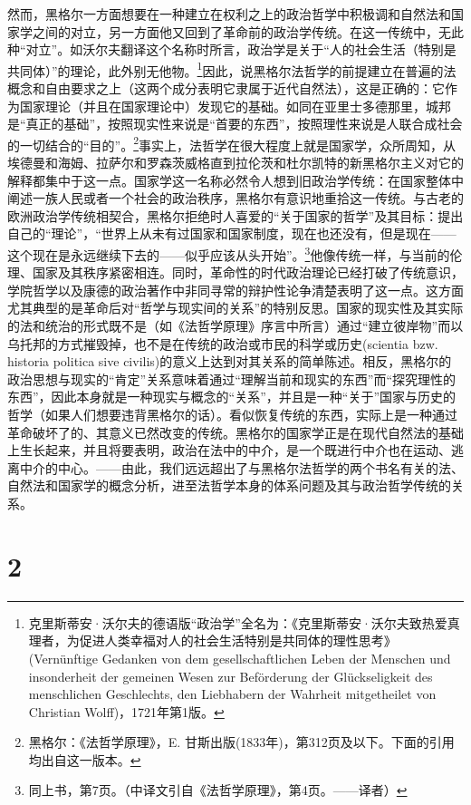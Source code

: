 然而，黑格尔一方面想要在一种建立在权利之上的政治哲学中积极调和自然法和国家学之间的对立，另一方面他又回到了革命前的政治学传统。在这一传统中，无此种“对立”。如沃尔夫翻译这个名称时所言，政治学是关于“人的社会生活（特别是共同体）”的理论，此外别无他物。\footnote{克里斯蒂安·沃尔夫的德语版“政治学”全名为：《克里斯蒂安·沃尔夫致热爱真理者，为促进人类幸福对人的社会生活特别是共同体的理性思考》(Vernünftige Gedanken von dem gesellschaftlichen Leben der Menschen und insonderheit der gemeinen Wesen zur Beförderung der Glückseligkeit des menschlichen Geschlechts, den Liebhabern der Wahrheit mitgetheilet von Christian Wolff)，1721年第1版。}因此，说黑格尔法哲学的前提建立在普遍的法概念和自由要求之上（这两个成分表明它隶属于近代自然法），这是正确的：它作为国家理论（并且在国家理论中）发现它的基础。如同在亚里士多德那里，城邦是“真正的基础”，按照现实性来说是“首要的东西”，按照理性来说是人联合成社会的一切结合的“目的”。\footnote{黑格尔：《法哲学原理》，E. 甘斯出版(1833年)，第312页及以下。下面的引用均出自这一版本。}事实上，法哲学在很大程度上就是国家学，众所周知，从埃德曼和海姆、拉萨尔和罗森茨威格直到拉伦茨和杜尔凯特的新黑格尔主义对它的解释都集中于这一点。国家学这一名称必然令人想到旧政治学传统：在国家整体中阐述一族人民或者一个社会的政治秩序，黑格尔有意识地重拾这一传统。与古老的欧洲政治学传统相契合，黑格尔拒绝时人喜爱的“关于国家的哲学”及其目标：提出自己的“理论”，“世界上从未有过国家和国家制度，现在也还没有，但是现在——这个现在是永远继续下去的——似乎应该从头开始”。\footnote{同上书，第7页。（中译文引自《法哲学原理》，第4页。——译者）}他像传统一样，与当前的伦理、国家及其秩序紧密相连。同时，革命性的时代政治理论已经打破了传统意识，学院哲学以及康德的政治著作中非同寻常的辩护性论争清楚表明了这一点。这方面尤其典型的是革命后对“哲学与现实间的关系”的特别反思。国家的现实性及其实际的法和统治的形式既不是（如《法哲学原理》序言中所言）通过“建立彼岸物”而以乌托邦的方式摧毁掉，也不是在传统的政治或市民的科学或历史(scientia bzw. historia politica sive civilis)的意义上达到对其关系的简单陈述。相反，黑格尔的政治思想与现实的“肯定”关系意味着通过“理解当前和现实的东西”而“探究理性的东西”，因此本身就是一种现实与概念的“关系”，并且是一种“关于”国家与历史的哲学（如果人们想要违背黑格尔的话）。看似恢复传统的东西，实际上是一种通过革命破坏了的、其意义已然改变的传统。黑格尔的国家学正是在现代自然法的基础上生长起来，并且将要表明，政治在法中的中介，是一个既进行中介也在运动、逃离中介的中心。——由此，我们远远超出了与黑格尔法哲学的两个书名有关的法、自然法和国家学的概念分析，进至法哲学本身的体系问题及其与政治哲学传统的关系。

\section*{2}

